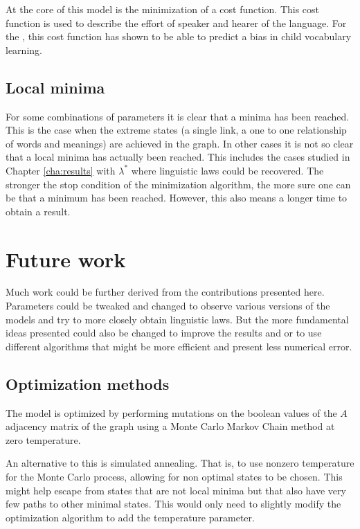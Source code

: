 At the core of this model is the minimization of a cost function.
This cost function is used to describe the effort of speaker and hearer of the language.
For the \firstmodel{}, this cost function has shown to be able to predict a bias in child vocabulary learning. \cite{Ferrer2017a} \cite{Carrera2021a}

\subsection{Local minima}
\label{sec:discussion_comp_minima}

For some combinations of parameters it is clear that a minima has been reached.
This is the case when the extreme states (a single link, a one to one relationship of words and meanings) are achieved in the graph.
In other cases it is not so clear that a local minima has actually been reached.
This includes the cases studied in Chapter \ref{cha:results} with $\lambda^*$ where linguistic laws could be recovered.
The stronger the stop condition of the minimization algorithm, the more sure one can be that a minimum has been reached.
However, this also means a longer time to obtain a result.

\section{Future work}
\label{sec:discussion_future-work}

Much work could be further derived from the contributions presented here.
Parameters could be tweaked and changed to observe various versions of the models and try to more closely obtain linguistic laws.
But the more fundamental ideas presented could also be changed to improve the results and or to use different algorithms that might be more efficient and present less numerical error.

\subsection{Optimization methods}
\label{sec:discussion_future-work_optimization}

The model is optimized by performing mutations on the boolean values of the $A$ adjacency matrix of the graph using a Monte Carlo Markov Chain method at zero temperature.

An alternative to this is simulated annealing.
That is, to use nonzero temperature for the Monte Carlo process, allowing for non optimal states to be chosen.
This might help escape from states that are not local minima but that also have very few paths to other minimal states.
This would only need to slightly modify the optimization algorithm to add the temperature parameter.

